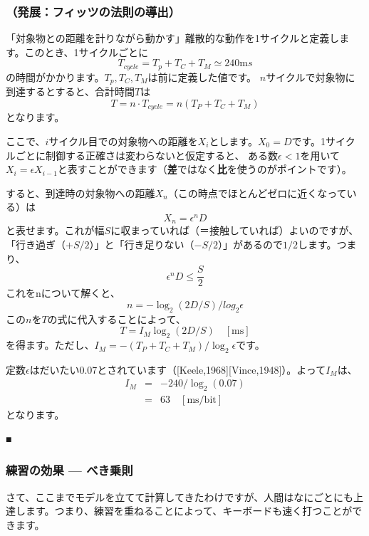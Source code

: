 \subsubsection{（発展：フィッツの法則の導出）}

\hspace{1zw}
「対象物との距離を計りながら動かす」離散的な動作を1サイクルと定義します。このとき、1サイクルごとに
\[
  T_{cycle} = T_p + T_C + T_M \simeq 240 {\mathrm ms}
\]
の時間がかかります。$T_p, T_C, T_M$は前に定義した値です。
$n$サイクルで対象物に到達するとすると、合計時間$T$は
\[
  T = n \cdot T_{cycle} = n ( T_P + T_C + T_M )
\]
となります。

ここで、$i$サイクル目での対象物への距離を$X_i$とします。$X_0 = D$です。1サイクルごとに制御する正確さは変わらないと仮定すると、
ある数$\epsilon < 1$を用いて$X_i = \epsilon X_{i-1}$と表すことができます（{\bf 差}ではなく{\bf 比}を使うのがポイントです）。

すると、到達時の対象物への距離$X_n$（この時点でほとんどゼロに近くなっている）は
\[
X_n = \epsilon^n D
\]
と表せます。これが幅$S$に収まっていれば（＝接触していれば）よいのですが、「行き過ぎ（$+S/2$）」と「行き足りない（$-S/2$）」があるので$1/2$します。つまり、
\[
  \epsilon^n D \le \frac{S}{2}
\]
これをnについて解くと、
\[
  n = -\log_2 (2D/S) / log_2 \epsilon
\]
この$n$を$T$の式に代入することによって、
\[
  T = I_M \log_2 (2D/S) \quad \mathrm{[ms]}
\]
を得ます。ただし、$I_M = -(T_P + T_C + T_M) / \log_2 \epsilon$です。

定数$\epsilon$はだいたい0.07とされています（[Keele,1968][Vince,1948]）。よって$I_M$は、
\begin{eqnarray*}
I_M &=& -240 / \log_2 (0.07) \\
    &=& 63 \quad \mathrm{[ms/bit]}
\end{eqnarray*}
となります。
\begin{flushright}
■
\end{flushright}

\subsubsection*{練習の効果 --- べき乗則}

さて、ここまでモデルを立てて計算してきたわけですが、人間はなにごとにも上達します。つまり、練習を重ねることによって、キーボードも速く打つことができます。

